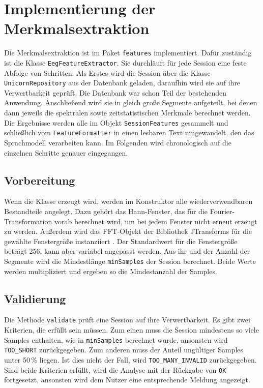 \section{Implementierung der Merkmalsextraktion}
\label{sec:impl-features}
Die Merkmalsextraktion ist im Paket \texttt{features} implementiert. Dafür zuständig ist die Klasse \texttt{EegFeatureExtractor}. Sie durchläuft für jede Session eine feste Abfolge von Schritten: Als Erstes wird die Session über die Klasse \texttt{UnicornRepository} aus der Datenbank geladen, daraufhin wird sie auf ihre Verwertbarkeit geprüft. Die Datenbank war schon Teil der bestehenden Anwendung. Anschließend wird sie in gleich große Segmente aufgeteilt, bei denen dann jeweils die spektralen sowie zeitstatistischen Merkmale berechnet werden. Die Ergebnisse werden alle im Objekt \texttt{SessionFeatures} gesammelt und schließlich vom \texttt{FeatureFormatter} in einen lesbaren Text umgewandelt, den das Sprachmodell verarbeiten kann. Im Folgenden wird chronologisch auf die einzelnen Schritte genauer eingegangen.

\subsection{Vorbereitung} Wenn die Klasse erzeugt wird, werden im Konstruktor alle wiederverwendbaren Bestandteile angelegt. Dazu gehört das Hann-Fenster, das für die Fourier-Transformation vorab berechnet wird, um bei jedem Fenster nicht erneut erzeugt zu werden. Außerdem wird das \ac{FFT}-Objekt der Bibliothek JTransforms für die gewählte Fenstergröße instanziiert \autocite{jtransforms}. Der Standardwert für die Fenstergröße beträgt 256, kann aber variabel angepasst werden. Aus ihr und der Anzahl der Segmente wird die Mindestlänge \texttt{minSamples} der Session berechnet. Beide Werte werden multipliziert und ergeben so die Mindestanzahl der Samples.
\newpage

\subsection{Validierung} Die Methode \texttt{validate} prüft eine Session auf ihre Verwertbarkeit. Es gibt zwei Kriterien, die erfüllt sein müssen. Zum einen muss die Session mindestens so viele Samples enthalten, wie in \texttt{minSamples} berechnet wurde, ansonsten wird \texttt{TOO\_SHORT} zurückgegeben. Zum anderen muss der Anteil ungültiger Samples unter 50\,\% liegen. Ist dies nicht der Fall, wird \texttt{TOO\_MANY\_INVALID} zurückgegeben. Sind beide Kriterien erfüllt, wird die Analyse mit der Rückgabe von \texttt{OK} fortgesetzt, ansonsten wird dem Nutzer eine entsprechende Meldung angezeigt.

